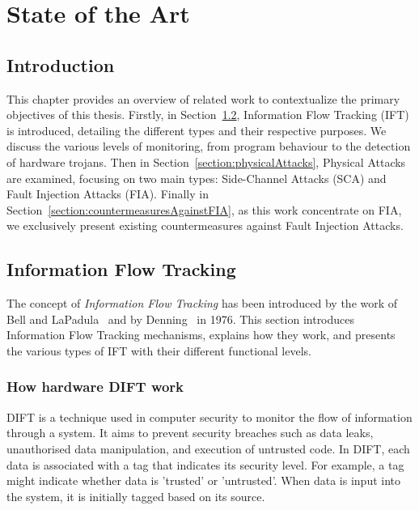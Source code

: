 \chapter{State of the Art}
\label{chapter:soa}
\minitoc

\section{Introduction}
This chapter provides an overview of related work to contextualize the primary objectives of this thesis. Firstly, in Section~\ref{section:ift}, Information Flow Tracking (IFT) is introduced, detailing the different types and their respective purposes. We discuss the various levels of monitoring, from program behaviour to the detection of hardware trojans.
Then in Section~\ref{section:physicalAttacks}, Physical Attacks are examined, focusing on two main types: Side-Channel Attacks (SCA) and Fault Injection Attacks (FIA).
Finally in Section~\ref{section:countermeasuresAgainstFIA}, as this work concentrate on FIA, we exclusively present existing countermeasures against Fault Injection Attacks.

\section{Information Flow Tracking}
\label{section:ift}
The concept of \textit{Information Flow Tracking} has been introduced by the work of Bell and LaPadula~\cite{BLP-76-military} and by Denning~\cite{D-76-commacm} in 1976.
This section introduces Information Flow Tracking mechanisms, explains how they work, and presents the various types of IFT with their different functional levels.

\subsection{How hardware DIFT work}
DIFT is a technique used in computer security to monitor the flow of information through a system. It aims to prevent security breaches such as data leaks, unauthorised data manipulation, and execution of untrusted code. In DIFT, each data is associated with a tag that indicates its security level.
For example, a tag might indicate whether data is 'trusted' or 'untrusted'. When data is input into the system, it is initially tagged based on its source.

